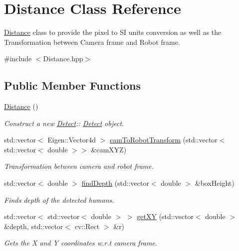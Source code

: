 \hypertarget{classDistance}{}\section{Distance Class Reference}
\label{classDistance}


\hyperlink{classDistance}{Distance} class to provide the pixel to SI units conversion as well as the Transformation between Camera frame and Robot frame.  




{\ttfamily \#include $<$Distance.\+hpp$>$}

\subsection*{Public Member Functions}
\begin{DoxyCompactItemize}
\item 
\mbox{\label{classDistance_a10c71cb57a2a8f5c66b2e91f63e3595a}} 
\hyperlink{classDistance_a10c71cb57a2a8f5c66b2e91f63e3595a}{Distance} ()
\begin{DoxyCompactList}\small\item\em Construct a new \hyperlink{classDetect}{Detect}\+:\+: \hyperlink{classDetect}{Detect} object. \end{DoxyCompactList}\item 
std\+::vector$<$ Eigen\+::\+Vector4d $>$ \hyperlink{classDistance_a96e37550dbd02a7ab2b3373068031198}{cam\+To\+Robot\+Transform} (std\+::vector$<$ std\+::vector$<$ double $>$$>$ \&cam\+X\+YZ)
\begin{DoxyCompactList}\small\item\em Transformation between camera and robot frame. \end{DoxyCompactList}\item 
std\+::vector$<$ double $>$ \hyperlink{classDistance_a9371ccc57f5038e09c65f15f7094b5b5}{find\+Depth} (std\+::vector$<$ double $>$ \&box\+Height)
\begin{DoxyCompactList}\small\item\em Finds depth of the detected humans. \end{DoxyCompactList}\item 
std\+::vector$<$ std\+::vector$<$ double $>$ $>$ \hyperlink{classDistance_a55adbc3ca34cb0c56237c84259305f5e}{get\+XY} (std\+::vector$<$ double $>$ \&depth, std\+::vector$<$ cv\+::\+Rect $>$ \&r)
\begin{DoxyCompactList}\small\item\em Gets the X and Y coordinates w.\+r.\+t camera frame. \end{DoxyCompactList}\item 
$$
\end{DoxyCompactItemize}
